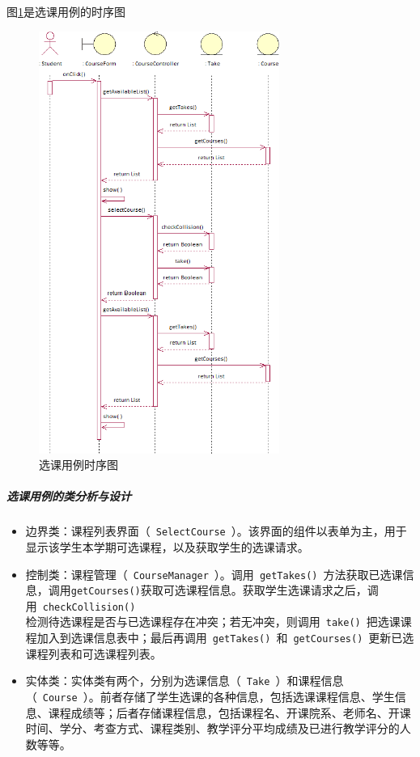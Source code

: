 图\ref{fig:selectcourse_secquence}是选课用例的时序图
\begin{figure}[htbp]
  \centering
  \includegraphics[width=0.7\textwidth]{img/selectcourse_secquence}
  \caption{选课用例时序图}
  \label{fig:selectcourse_secquence}
\end{figure}
    
\subparagraph{选课用例的类分析与设计}
\begin{itemize}
  \item 边界类：课程列表界面（~\texttt{SelectCourse}~）。该界面的组件以表单为主，用于显示该学生本学期可选课程，以及获取学生的选课请求。

  \item 控制类：课程管理（~\texttt{CourseManager}~）。调用~\texttt{getTakes()}~方法获取已选课信息，调用\texttt{getCourses()}获取可选课程信息。获取学生选课请求之后，调用~\texttt{checkCollision()}~\\检测待选课程是否与已选课程存在冲突；若无冲突，则调用~\texttt{take()}~把选课课程加入到选课信息表中；最后再调用~\texttt{getTakes()}~和~\texttt{getCourses()}~更新已选课程列表和可选课程列表。

  \item 实体类：实体类有两个，分别为选课信息（~\texttt{Take}~）和课程信息（~\texttt{Course}~）。前者存储了学生选课的各种信息，包括选课课程信息、学生信息、课程成绩等；后者存储课程信息，包括课程名、开课院系、老师名、开课时间、学分、考查方式、课程类别、教学评分平均成绩及已进行教学评分的人数等等。
\end{itemize}
    

